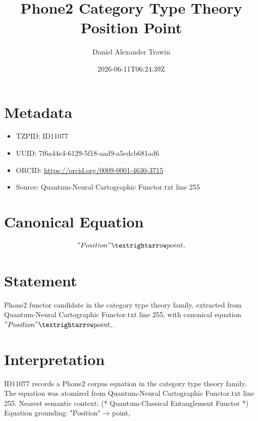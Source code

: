 \documentclass[11pt]{article}
\title{Phone2 Category Type Theory Position Point}
\author{Daniel Alexander Trawin}
\date{2026-06-11T06:24:39Z}
\begin{document}
\maketitle
\section*{Metadata}
\begin{itemize}
\item TZPID: ID11077
\item UUID: 7f6a44e4-6129-5f18-aad9-a5cdcb681ad6
\item ORCID: \url{https://orcid.org/0009-0001-4630-3715}
\item Source: Quantum-Neural Cartographic Functor.txt line 255
\end{itemize}
\section*{Canonical Equation}
\[
"Position" → point,
\]
\section*{Statement}
Phone2 functor candidate in the category type theory family, extracted from Quantum-Neural Cartographic Functor.txt line 255, with canonical equation $"Position" → point,$.
\section*{Interpretation}
ID11077 records a Phone2 corpus equation in the category type theory family. The equation was atomized from Quantum-Neural Cartographic Functor.txt line 255. Nearest semantic context: (* Quantum-Classical Entanglement Functor *) Equation grounding: "Position" → point,
\end{document}
